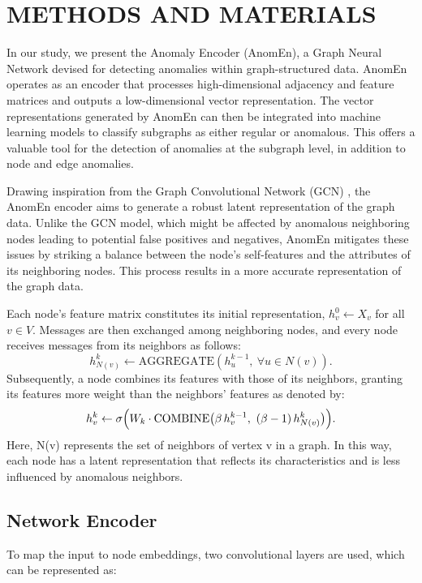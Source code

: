 \documentclass[10pt,twocolumn,a4paper]{article}
\begin{document}
\section{METHODS AND MATERIALS}

In our study, we present the Anomaly Encoder (AnomEn), a Graph Neural Network devised for detecting anomalies within graph-structured data. AnomEn operates as an encoder that processes high-dimensional adjacency and feature matrices and outputs a low-dimensional vector representation. The vector representations generated by AnomEn can then be integrated into machine learning models to classify subgraphs as either regular or anomalous. This offers a valuable tool for the detection of anomalies at the subgraph level, in addition to node and edge anomalies.

Drawing inspiration from the Graph Convolutional Network (GCN) \cite{kipf2017semi}, the AnomEn encoder aims to generate a robust latent representation of the graph data. Unlike the GCN model, which might be affected by anomalous neighboring nodes leading to potential false positives and negatives, AnomEn \cite{electronics12061501}\cite{9376881}mitigates these issues by striking a balance between the node's self-features and the attributes of its neighboring nodes. This process results in a more accurate representation of the graph data.

Each node's feature matrix constitutes its initial representation, $h_v^{0} \leftarrow X_v$ for all $v \in V$. Messages are then exchanged among neighboring nodes, and every node receives messages from its neighbors as follows:
\begin{equation*}
  h_{N(v)}^{k} \leftarrow \mathrm{AGGREGATE}\left(h_u^{k-1},\ \forall u \in N(v)\right).
\end{equation*}
Subsequently, a node combines its features with those of its neighbors, granting its features more weight than the neighbors' features as denoted by:
\begin{equation*}
  h_v^{k} \leftarrow \sigma\Bigl(W_k\cdot\mathrm{COMBINE}\bigl(\beta\,h_v^{k-1},\ (\beta-1)\,h_{N(v)}^{k}\bigr)\Bigr).
\end{equation*}
Here, N(v) represents the set of neighbors of vertex v in a graph. In this way, each node has a latent representation that reflects its characteristics and is less influenced by anomalous neighbors.

\subsection{Network Encoder}
To map the input to node embeddings, two convolutional layers are used, which can be represented as:
\end{document}
